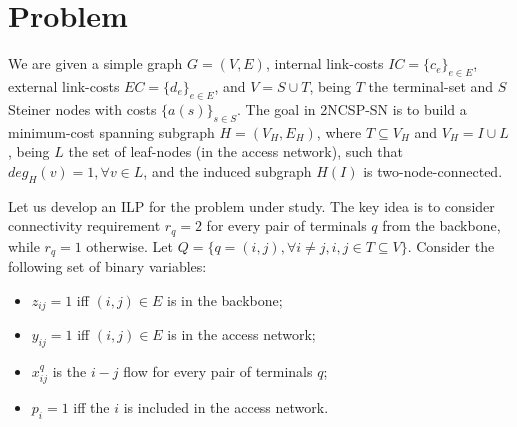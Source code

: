 \documentclass{endm}
\begin{document}
\section{Problem}\label{Problem}
We are given a simple graph $G = (V,E)$, internal link-costs $IC = \{c_{e}\}_{e\in E}$, external link-costs $EC = \{d_{e}\}_{e\in E}$, and $V=S\cup T$, being $T$ the terminal-set and
$S$ Steiner nodes with costs $\{a(s)\}_{s\in S}$. The goal in 2NCSP-SN is to build a minimum-cost spanning subgraph $H = (V_H,E_H)$, where $T \subseteq V_H$ and $V_H = I \cup L$, being $L$ the set of leaf-nodes (in the access network), such that $deg_{H}(v) = 1, \forall v\in L$, and
the induced subgraph $H(I)$ is two-node-connected.



Let us develop an ILP for the problem under study. The key idea is to consider connectivity requirement $r_q=2$ for every pair of terminals $q$ from the backbone, while $r_q=1$ otherwise.
Let $Q=\{q=(i,j),\forall i\neq j, i,j \in T\subseteq V\}$. Consider the following set of binary variables:
\begin{itemize}
\item  $z_{ij}=1$ iff $(i,j)\in E$ is in the backbone;
\item $y_{ij}=1$ iff $(i,j)\in E$ is in the access network;
\item $x_{ij}^{q}$ is the $i-j$ flow for every pair of terminals $q$;
\item $p_{i}=1$ iff the $i$ is included in the access network.
\end{itemize}
\end{document}
